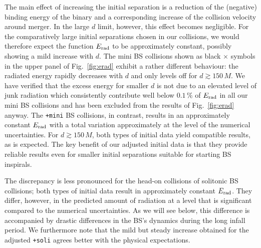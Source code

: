 \documentclass[]{iopart}
\newcommand{\us}[1]{\textcolor{teal}{[{\it\textbf{US: #1}}]} }
\renewcommand{\mr}[1]{\textcolor{purple}{[{\it\textbf{MR: #1}}]} }
\begin{document}
The main effect of increasing the initial separation is a
reduction of the (negative) binding energy of the binary and a corresponding
increase of the collision velocity around merger. In the large
$d$ limit, however, this effect becomes negligible. For the
comparatively large initial separations chosen in our
collisions, we would therefore
expect the function $E_{\rm rad}$ to be approximately constant,
possibly showing a mild increase with $d$. The mini BS collisions
shown as black $\times$ symbols in the upper panel of
Fig.~\ref{fig:erad} exhibit a rather different behaviour:
the radiated energy rapidly decreases with $d$ and only levels
off for $d\gtrsim 150\,M$. We have verified that the excess
energy for smaller $d$ is not due to an elevated level of
junk radiation which consistently contribute well below 
$0.1\,\%$ of $E_{\rm rad}$ in all our mini BS collisions and has
been excluded from the results of Fig.~\ref{fig:erad} anyway.
The {\tt +mini} BS collisions,
in contrast, results in an approximately constant $E_{\rm rad}$
with a total variation approximately at the level of the
numerical uncertainties. For $d\gtrsim 150\,M$, both types of
initial data yield compatible results, as is expected.
The key benefit of our adjusted initial data is that they provide
reliable results even for smaller initial separations suitable
for starting BS inspirals.

The discrepancy is less pronounced for the head-on collisions
of solitonic BS collisions; both types of initial data result
in approximately constant $E_{\rm rad}$. They differ, however,
in the predicted amount of radiation at a level that
is significant compared to
the numerical uncertainties. As we will see below, this difference
is accompanied by drastic differences in the BS's dynamics during the
long infall period. We furthermore note that the mild but
steady increase obtained for the adjusted {\tt +soli} agrees
better with the physical expectations.
\end{document}
